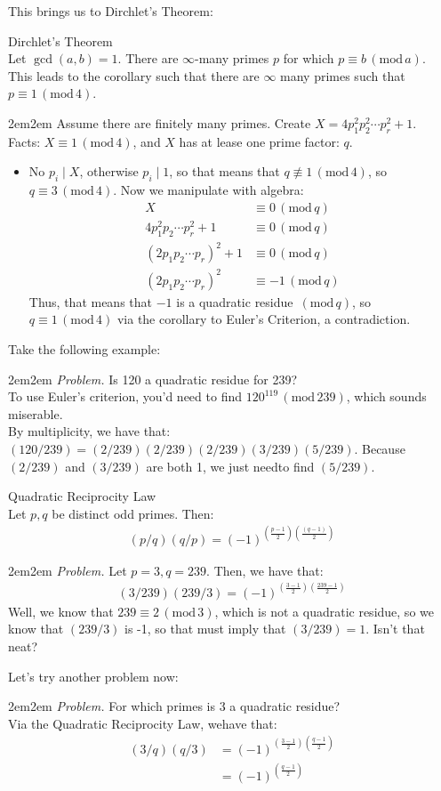 \documentclass[10pt,oneside]{book}
\newcommand{\gspc}{\vspace{0.13cm}} %
\newcommand{\gline}{\gspc\\} %
\newcommand{\gmod}[1]{\,(\text{mod}\,#1)}
\let\endoldproof\endproof
\renewenvironment{proof}[1][\proofname]
  {\vspace{0.2cm}\begin{adjustwidth}{2em}{2em}
   \oldproof[#1]}
  {\endoldproof
\end{adjustwidth}}
\newenvironment{problem}[1]
  {\vspace{-0.1cm}\begin{coloredadjust}\begin{adjustwidth}{2em}{2em}
   \textit{Problem. }#1}
  {\endoldproof
\end{adjustwidth}\end{coloredadjust}\gspc}
\begin{document}
This brings us to Dirchlet's Theorem:
\begin{theorem}{Dirchlet's Theorem }{}\gline
  Let $\gcd(a,b) =1$. There are $\infty$-many primes $p$ for which $p\equiv b \gmod{a}$.\gline
  This leads to the corollary such that there are $\infty$ many primes such that $p\equiv 1 \gmod 4$. 
  \begin{proof}
    Assume there are finitely many primes. Create $X = 4p_1^2p_2^2\cdots p_r^2 + 1$.\gline
    Facts: $X\equiv 1 \gmod 4$, and $X$ has at lease one prime factor: $q$. 
    \begin{itemize}
      \item No $p_i\mid X$, otherwise $p_i\mid 1$, so that means that $q\not\equiv 1 \gmod 4$, so $q\equiv 3\gmod 4$. Now we manipulate with algebra:
      \begin{align*}
        X&\equiv 0 \gmod q\\
        4p_1^2p_2\cdots p_r^2 +1&\equiv 0 \gmod q\\
        (2p_1p_2\cdots p_r)^2 + 1&\equiv 0 \gmod q\\
        (2p_1p_2\cdots p_r)^2 &\equiv -1 \gmod q
      \end{align*}
      Thus, that means that $-1$ is a quadratic residue $\gmod q$, so $q\equiv 1 \gmod 4$ via the corollary to Euler's Criterion, a contradiction. 
    \end{itemize}
  \end{proof}
\end{theorem}
Take the following example:
\begin{problem}
  Is 120 a quadratic residue for 239?\gline
  To use Euler's criterion, you'd need to find $120^{119}\gmod{239}$, which sounds miserable.\gline
  By multiplicity, we have that: $(120/239)=(2/239)(2/239)(2/239)(3/239)(5/239)$. Because $(2/239)$ and $(3/239)$ are both 1, we just needto find $(5/239).$
\end{problem}
\begin{theorem}{Quadratic Reciprocity Law} {}\gline
  Let $p,q$ be distinct odd primes. Then:
  \begin{gather*}
    (p/q)(q/p)= (-1)^{\left(\frac{p-1}2\right)\left(\frac{(q-1)}2\right)}
  \end{gather*}
\end{theorem}
\begin{problem}
  Let $p = 3, q= 239$. Then, we have that:
  \begin{gather*}
    (3/239)(239/3) = (-1)^{\left(\frac{3-1}2\right)\left(\frac{239-1}2\right)}
  \end{gather*}
  Well, we know that $239 \equiv 2 \gmod 3$, which is not a quadratic residue, so we know that $(239/3)$ is -1, so that must imply that $(3/239)=1$. Isn't that neat?
\end{problem}
Let's try another problem now:
\begin{problem}
  For which primes is 3 a quadratic residue?\gline
  Via the Quadratic Reciprocity Law, wehave that:
  \begin{align*}
    (3/q)(q/3)&=(-1)^{\left(\frac{3-1}2\right)\left(\frac{q-1}2\right)}\\
    &=(-1)^{\left(\frac{q-1}2\right)}
  \end{align*}
\end{problem}
\end{document}
